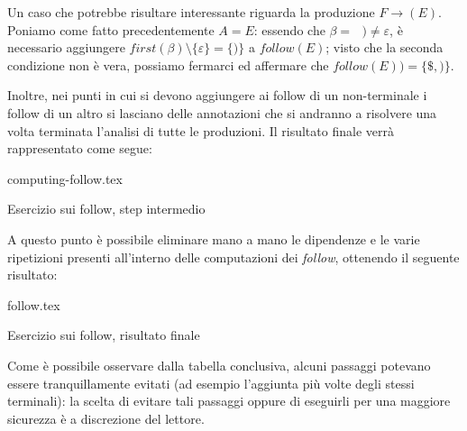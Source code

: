 \documentclass[class=book, crop=false, oneside, 12pt]{standalone}
\begin{document}
Un caso che potrebbe risultare interessante riguarda la produzione \(F \rightarrow (E)\). Poniamo come fatto precedentemente \(A = E\): essendo che \(\beta = \textrm{ } ) \neq \varepsilon\), è necessario aggiungere \(first(\beta) \setminus \{\varepsilon\} = \{)\}\) a \(follow(E)\); visto che la seconda condizione non è vera, possiamo fermarci ed affermare che \(follow(E)) = \{\$, )\}\).

Inoltre, nei punti in cui si devono aggiungere ai follow di un non-terminale i follow di un altro si lasciano delle annotazioni che si andranno a risolvere una volta terminata l'analisi di tutte le produzioni. Il risultato finale verrà rappresentato come segue:
\begin{table}[H]
	\centering
	{computing-follow.tex}
    \caption{Esercizio sui follow, step intermedio}
    \label{computing-follow}
\end{table}
A questo punto è possibile eliminare mano a mano le dipendenze e le varie ripetizioni presenti all'interno delle computazioni dei \emph{follow}, ottenendo il seguente risultato: 
\begin{table}[H]
	\centering
	{follow.tex}
    \caption{Esercizio sui follow, risultato finale}
    \label{follow}
\end{table}
Come è possibile osservare dalla tabella conclusiva, alcuni passaggi potevano essere tranquillamente evitati (ad esempio l'aggiunta più volte degli stessi terminali): la scelta di evitare tali passaggi oppure di eseguirli per una maggiore sicurezza è a discrezione del lettore.
\end{document}
